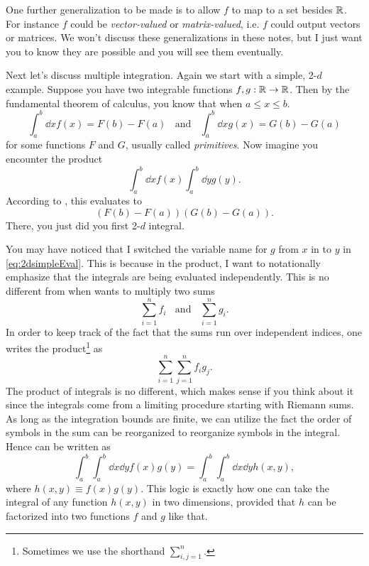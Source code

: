 One further generalization to be made is to allow $f$ to map to a set besides
$\mathbb{R}$. For instance $f$ could be {\it vector-valued} 
or {\it matrix-valued}, i.e. $f$ could output
vectors or matrices. 
We won't
discuss these generalizations in these notes, but I just want you to know they
are possible and you will see them eventually.

Next let's discuss multiple integration. Again we start with a simple, 2-$d$
example. Suppose you have two integrable functions $f,g:\mathbb{R}\to\mathbb{R}$. Then by the
fundamental theorem of calculus, you know that when $a\leq x\leq b$.
\begin{equation}\label{eq:2dsimple}
\int_a^b\dd{x}f(x)=F(b)-F(a)~~~~\text{and}~~~~
\int_a^b\dd{x}g(x)=G(b)-G(a)
\end{equation}
for some functions $F$ and $G$, usually called {\it
primitives}. Now imagine you encounter the product
\begin{equation}\label{eq:2dsimpleEval}
\int_a^b\dd{x}f(x)\int_a^b\dd{y}g(y).
\end{equation}
According to , this evaluates to
\begin{equation}
\left(F(b)-F(a)\right)\left(G(b)-G(a)\right).
\end{equation}
There, you just did you first 2-$d$ integral.

You may have noticed that I switched the variable name for $g$ from $x$ in
 to $y$ in \eqref{eq:2dsimpleEval}. This is because in the
product, I want to notationally emphasize that the integrals are being evaluated
independently. This is no different from when wants to multiply two sums
\begin{equation}
  \sum_{i=1}^n f_i~~~~\text{and}~~~~\sum_{i=1}^n g_i.
\end{equation}
In order to keep track of the fact that the sums run over independent indices,
one writes the product\footnote{Sometimes we use the shorthand
$\sum_{i,j=1}^n$.} as
\begin{equation}
  \sum_{i=1}^n\sum_{j=1}^n f_ig_j.
\end{equation}
The product of integrals is no different, which makes sense if you think about
it since the integrals come from a limiting procedure starting with Riemann
sums. As long as the integration bounds are finite, we can utilize the fact
the order of symbols in the sum can be reorganized to reorganize symbols in the
integral. Hence  can be written as
\begin{equation}\label{eq:2dprodInt}
\int_a^b\int_a^b\dd{x}\dd{y}f(x)g(y)
=\int_a^b\int_a^b\dd{x}\dd{y}h(x,y),
\end{equation}
where $h(x,y)\equiv f(x)g(y)$. This logic is exactly how one can take the
integral of any function $h(x,y)$ in two dimensions, provided that $h$ can be
factorized into two functions $f$ and $g$ like that. 

